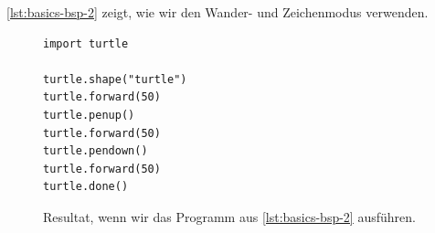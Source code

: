 \begin{example}

\autoref{lst:basics-bsp-2} zeigt, wie wir den Wander- und Zeichenmodus verwenden.

\begin{figure}[htb]
\centering
\begin{minipage}{0.5\linewidth}
\centering
\begin{lstlisting}[language={python3}, caption={Beispielprogramm, welches die Figur aus \autoref{fig:basics-bsp-2} zeichnet (\graybgtexttt{bsp\_2.py}).}, label={lst:basics-bsp-2}]
import turtle

turtle.shape("turtle")
turtle.forward(50)
turtle.penup()
turtle.forward(50)
turtle.pendown()
turtle.forward(50)
turtle.done()

\end{lstlisting}
\end{minipage}
\hfill
\begin{minipage}[c]{0.4\linewidth}
\centering
{}
\caption{Resultat, wenn wir das Programm aus \autoref{lst:basics-bsp-2} ausführen.}
\label{fig:basics-bsp-2}
\end{minipage}
\end{figure}

\end{example}
